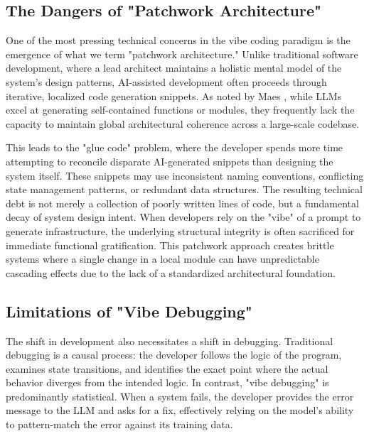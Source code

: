 \documentclass[../tanulmany.tex]{subfiles}
\begin{document}
\subsection{The Dangers of "Patchwork Architecture"}

One of the most pressing technical concerns in the vibe coding paradigm is the emergence of what we term "patchwork architecture." Unlike traditional software development, where a lead architect maintains a holistic mental model of the system's design patterns, AI-assisted development often proceeds through iterative, localized code generation snippets. As noted by Maes \cite{maes2025gotchas}, while LLMs excel at generating self-contained functions or modules, they frequently lack the capacity to maintain global architectural coherence across a large-scale codebase.

This leads to the "glue code" problem, where the developer spends more time attempting to reconcile disparate AI-generated snippets than designing the system itself. These snippets may use inconsistent naming conventions, conflicting state management patterns, or redundant data structures. The resulting technical debt is not merely a collection of poorly written lines of code, but a fundamental decay of system design intent. When developers rely on the "vibe" of a prompt to generate infrastructure, the underlying structural integrity is often sacrificed for immediate functional gratification. This patchwork approach creates brittle systems where a single change in a local module can have unpredictable cascading effects due to the lack of a standardized architectural foundation. \cite{prather2024widening}

\subsection{Limitations of "Vibe Debugging"}

The shift in development also necessitates a shift in debugging. Traditional debugging is a causal process: the developer follows the logic of the program, examines state transitions, and identifies the exact point where the actual behavior diverges from the intended logic. In contrast, "vibe debugging" is predominantly statistical. When a system fails, the developer provides the error message to the LLM and asks for a fix, effectively relying on the model's ability to pattern-match the error against its training data.
\end{document}

